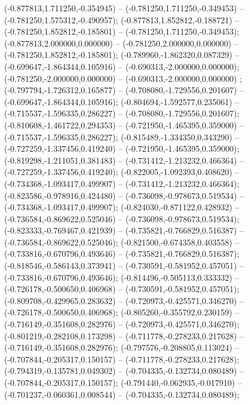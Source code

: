  (-0.877813,1.711250,-0.354945) -- (-0.781250,1.711250,-0.349453) -- (-0.781250,1.575312,-0.490957);
 (-0.877813,1.852812,-0.188721) -- (-0.781250,1.852812,-0.185801) -- (-0.781250,1.711250,-0.349453);
 (-0.877813,2.000000,0.000000) -- (-0.781250,2.000000,0.000000) -- (-0.781250,1.852812,-0.185801);
 (-0.789960,-1.862320,0.087329) -- (-0.699647,-1.864344,0.105916) -- (-0.690313,-2.000000,0.000000);
 (-0.781250,-2.000000,0.000000) -- (-0.690313,-2.000000,0.000000) ;
 (-0.797794,-1.726312,0.165877) -- (-0.708080,-1.729556,0.201607) -- (-0.699647,-1.864344,0.105916);
 (-0.804694,-1.592577,0.235061) -- (-0.715537,-1.596335,0.286227) -- (-0.708080,-1.729556,0.201607);
 (-0.810608,-1.461722,0.294353) -- (-0.721950,-1.465395,0.359000) -- (-0.715537,-1.596335,0.286227);
 (-0.815489,-1.334350,0.343290) -- (-0.727259,-1.337456,0.419240) -- (-0.721950,-1.465395,0.359000);
 (-0.819298,-1.211051,0.381483) -- (-0.731412,-1.213232,0.466364) -- (-0.727259,-1.337456,0.419240);
 (-0.822005,-1.092393,0.408620) -- (-0.734368,-1.093417,0.499907) -- (-0.731412,-1.213232,0.466364);
 (-0.823586,-0.978916,0.424480) -- (-0.736098,-0.978673,0.519534) -- (-0.734368,-1.093417,0.499907);
 (-0.824030,-0.871122,0.428932) -- (-0.736584,-0.869622,0.525046) -- (-0.736098,-0.978673,0.519534);
 (-0.823333,-0.769467,0.421939) -- (-0.735821,-0.766829,0.516387) -- (-0.736584,-0.869622,0.525046);
 (-0.821500,-0.674358,0.403558) -- (-0.733816,-0.670796,0.493646) -- (-0.735821,-0.766829,0.516387);
 (-0.818546,-0.586143,0.373941) -- (-0.730591,-0.581952,0.457051) -- (-0.733816,-0.670796,0.493646);
 (-0.814496,-0.505113,0.333332) -- (-0.726178,-0.500650,0.406968) -- (-0.730591,-0.581952,0.457051);
 (-0.809708,-0.429965,0.283632) -- (-0.720973,-0.425571,0.346270) -- (-0.726178,-0.500650,0.406968);
 (-0.805260,-0.355792,0.230159) -- (-0.716149,-0.351608,0.282976) -- (-0.720973,-0.425571,0.346270);
 (-0.801219,-0.282108,0.173298) -- (-0.711778,-0.278233,0.217628) -- (-0.716149,-0.351608,0.282976);
 (-0.797576,-0.208805,0.113024) -- (-0.707844,-0.205317,0.150157) -- (-0.711778,-0.278233,0.217628);
 (-0.794319,-0.135781,0.049302) -- (-0.704335,-0.132734,0.080489) -- (-0.707844,-0.205317,0.150157);
 (-0.791440,-0.062935,-0.017910) -- (-0.701237,-0.060361,0.008544) -- (-0.704335,-0.132734,0.080489);
